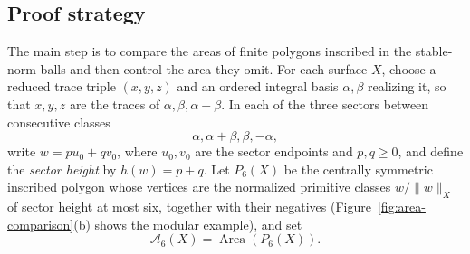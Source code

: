 \documentclass[10pt,twoside]{article}
\theoremstyle{plain}
\theoremstyle{definition}
\theoremstyle{remark}
\DeclareMathOperator{\Area}{Area}
\newcommand{\A}{\mathcal A}
\begin{document}
\subsection{Proof strategy}
The main step is to compare the areas of finite polygons inscribed
in the stable-norm balls and then control the area they omit.
For each surface $X$, choose a reduced trace triple $(x,y,z)$ and
an ordered integral basis $\alpha,\beta$ realizing it, so that
$x,y,z$ are the traces of $\alpha,\beta,\alpha+\beta$. In each of the three sectors between consecutive
classes
$$
\alpha,\alpha+\beta,\beta,-\alpha,
$$
write $w=pu_0+qv_0$, where $u_0,v_0$ are the sector endpoints and $p,q\geq0$, and
define the \emph{sector height} by $h(w)=p+q$.
Let $P_6(X)$ be the centrally symmetric inscribed polygon whose vertices
are the normalized primitive classes
$
w/\|w\|_X
$
of sector height at most six, together with their negatives
(Figure~\ref{fig:area-comparison}(b) shows the modular example), and set
$$
\A_6(X)=\Area(P_6(X)).
$$
\end{document}
